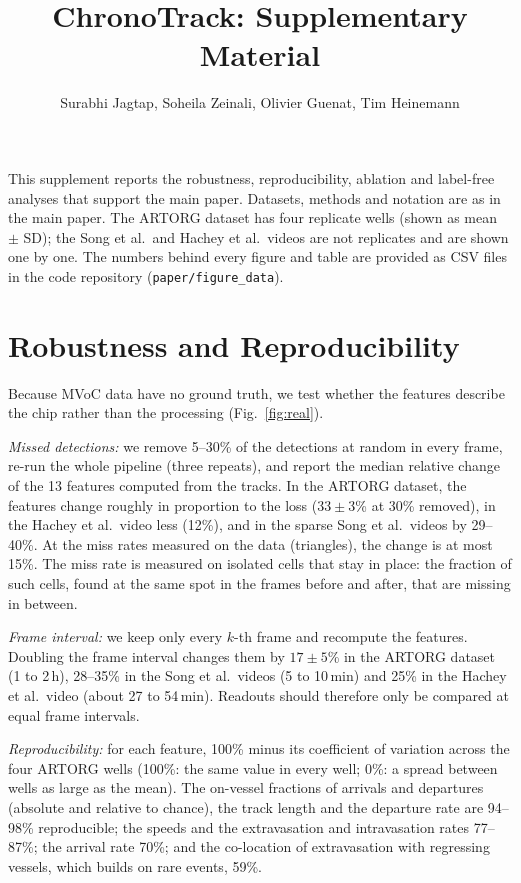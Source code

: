 \documentclass[onecolumn,10pt]{IEEEtran}
\title{ChronoTrack: Supplementary Material}
\author{Surabhi Jagtap, Soheila Zeinali, Olivier Guenat, Tim Heinemann}
\begin{document}
\maketitle

This supplement reports the robustness, reproducibility, ablation and label-free analyses that support the main paper. Datasets, methods and notation are as in the main paper. The ARTORG dataset has four replicate wells (shown as mean $\pm$ SD); the Song et al.\ and Hachey et al.\ videos are not replicates and are shown one by one. The numbers behind every figure and table are provided as CSV files in the code repository (\texttt{paper/figure\_data}).

\section{Robustness and Reproducibility}
Because MVoC data have no ground truth, we test whether the features describe the chip rather than the processing (Fig.~\ref{fig:real}).

\emph{Missed detections:} we remove 5--30\% of the detections at random in every frame, re-run the whole pipeline (three repeats), and report the median relative change of the 13 features computed from the tracks. In the ARTORG dataset, the features change roughly in proportion to the loss ($33\pm3$\% at 30\% removed), in the Hachey et al.\ video less (12\%), and in the sparse Song et al.\ videos by 29--40\%. At the miss rates measured on the data (triangles), the change is at most 15\%. The miss rate is measured on isolated cells that stay in place: the fraction of such cells, found at the same spot in the frames before and after, that are missing in between.

\emph{Frame interval:} we keep only every $k$-th frame and recompute the features. Doubling the frame interval changes them by $17\pm5$\% in the ARTORG dataset (1 to 2\,h), 28--35\% in the Song et al.\ videos (5 to 10\,min) and 25\% in the Hachey et al.\ video (about 27 to 54\,min). Readouts should therefore only be compared at equal frame intervals.

\emph{Reproducibility:} for each feature, 100\% minus its coefficient of variation across the four ARTORG wells (100\%: the same value in every well; 0\%: a spread between wells as large as the mean). The on-vessel fractions of arrivals and departures (absolute and relative to chance), the track length and the departure rate are 94--98\% reproducible; the speeds and the extravasation and intravasation rates 77--87\%; the arrival rate 70\%; and the co-location of extravasation with regressing vessels, which builds on rare events, 59\%.
\end{document}
